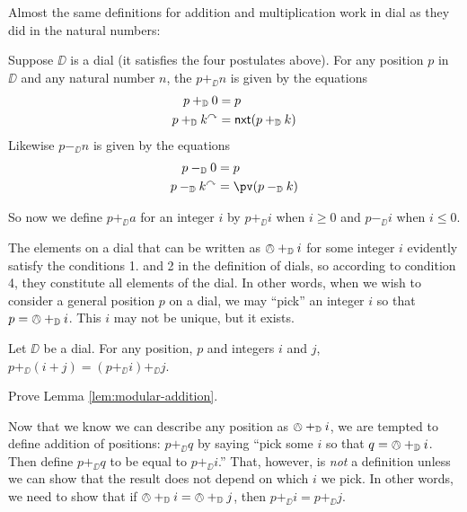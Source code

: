 Almost the same definitions for addition and multiplication work in dial as they did in the natural numbers:

\begin{defn}
	Suppose $\DD$ is a dial (it satisfies the four postulates above). For any position $p$ in $\DD$ and any natural number $n$, the  $p+_\DD n$ is given by the equations
	\begin{align*}
		p +_{\mathbb D} 0 &= p\\
		p +_{\mathbb D} k^\curvearrowright &= {\mathord{\textsf{nxt}}}(p+_{\mathbb D} k)
	\end{align*}
	Likewise $p -_\DD n$ is given by the equations
	\begin{align*}
	p -_\DD 0 &= p\\
	p -_\DD k^\nxt &= \pv(p-_\DD k)
	\end{align*}
\end{defn}



So now we define $p +_\DD a$ for an integer $i$ by $p +_\DD i$ when $i\geq 0$ and $p -_\DD i$ when $i \leq 0$.

The elements on a dial that can be written as $\owedge +_{\mathbb D} i$ for some integer $i$ evidently satisfy the conditions 1. and 2 in the definition of dials, so according to condition 4, they constitute all elements of the dial.   
In other words, when we wish to consider a general position $p$ on a dial, we may ``pick'' an integer $i$ so that $p = \owedge +_{\mathbb D} i$. This $i$ may not be unique, but it exists.

\begin{lem}\label{lem:modular-addition}
	Let $\DD$ be a dial. For any position, $p$ and integers $i$ and $j$,
	$p +_\DD (i+j) = (p +_\DD i) +_\DD j$.
\end{lem}



\begin{exer}
	\begin{exercise}
		\item Prove Lemma \ref{lem:modular-addition}.
	\end{exercise}
\end{exer}

Now that we know we can describe any position as $\owedge +_{\mathbb D} i$, we are tempted to define addition of positions: $p +_\DD q$ by saying ``pick some $i$ so that $q = \owedge +_{\mathbb D} i$. Then define $p+_\DD q$ to be equal to $p +_\DD i$.'' That, however, is \emph{not} a definition unless we can show that the result does not depend on which $i$ we pick. In other words, we need to show that if $\owedge +_{\mathbb D} i = \owedge +_{\mathbb D} j$, then $p +_\DD i = p +_\DD j$.

